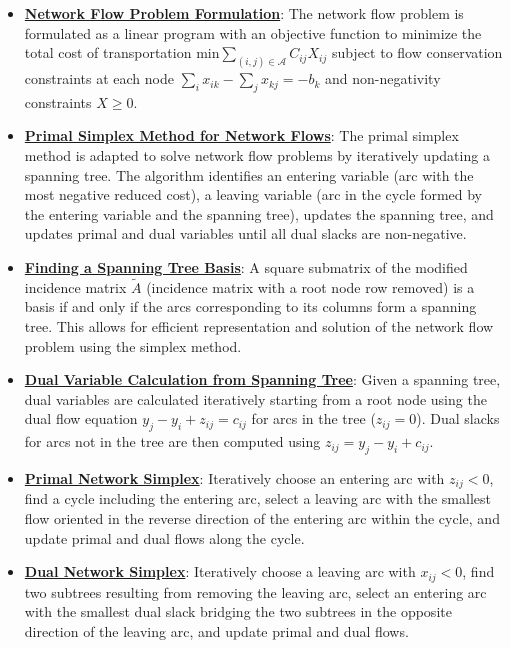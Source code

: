 \documentclass{article}%
\begin{document}
\begin{itemize}[leftmargin=*]%
\item \href{https://www.math.purdue.edu/~yipn/421//2024-11-05-NetFlows.pdf#page=2}{\textbf{Network Flow Problem Formulation}}: The network flow problem is formulated as a linear program with an objective function to minimize the total cost of transportation $\text{min} \sum_{(i,j) \in \mathcal{A}} C_{ij} X_{ij}$ subject to flow conservation constraints at each node $\sum_{i} x_{ik} - \sum_{j} x_{kj} = -b_k$ and non-negativity constraints $X \ge 0$.%
\item \href{https://www.math.purdue.edu/~yipn/421//2024-11-05-NetFlows.pdf#page=22}{\textbf{Primal Simplex Method for Network Flows}}: The primal simplex method is adapted to solve network flow problems by iteratively updating a spanning tree.  The algorithm identifies an entering variable (arc with the most negative reduced cost), a leaving variable (arc in the cycle formed by the entering variable and the spanning tree), updates the spanning tree, and updates primal and dual variables until all dual slacks are non-negative.%
\item \href{https://www.math.purdue.edu/~yipn/421//2024-11-05-NetFlows.pdf#page=15}{\textbf{Finding a Spanning Tree Basis}}: A square submatrix of the modified incidence matrix $\tilde{A}$ (incidence matrix with a root node row removed) is a basis if and only if the arcs corresponding to its columns form a spanning tree.  This allows for efficient representation and solution of the network flow problem using the simplex method.%
\item \href{https://www.math.purdue.edu/~yipn/421//2024-11-05-NetFlows.pdf#page=18}{\textbf{Dual Variable Calculation from Spanning Tree}}: Given a spanning tree, dual variables are calculated iteratively starting from a root node using the dual flow equation $y_j - y_i + z_{ij} = c_{ij}$ for arcs in the tree ($z_{ij} = 0$).  Dual slacks for arcs not in the tree are then computed using $z_{ij} = y_j - y_i + c_{ij}$.%
\end{itemize}%
\begin{itemize}[leftmargin=*]%
\item \href{https://www.math.purdue.edu/~yipn/421//2024-11-07-NetSimplex.pdf#page=5}{\textbf{Primal Network Simplex}}: Iteratively choose an entering arc with $z_{ij} < 0$, find a cycle including the entering arc, select a leaving arc with the smallest flow oriented in the reverse direction of the entering arc within the cycle, and update primal and dual flows along the cycle.%
\item \href{https://www.math.purdue.edu/~yipn/421//2024-11-07-NetSimplex.pdf#page=32}{\textbf{Dual Network Simplex}}: Iteratively choose a leaving arc with $x_{ij} < 0$, find two subtrees resulting from removing the leaving arc, select an entering arc with the smallest dual slack bridging the two subtrees in the opposite direction of the leaving arc, and update primal and dual flows.%
\end{itemize}%
\end{document}
